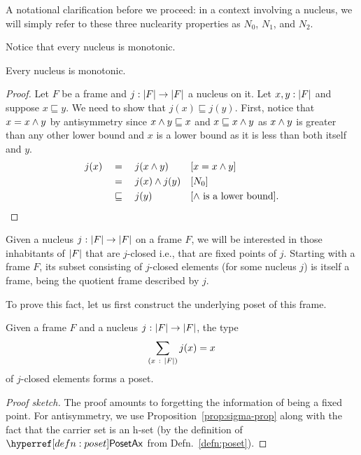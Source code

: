 A notational clarification before we proceed: in a context involving a nucleus, we will
simply refer to these three nuclearity properties as $N_0$, $N_1$, and $N_2$.

Notice that every nucleus is monotonic.
\begin{prop}\label{prop:nucleus-mono}
  Every nucleus is monotonic.
\end{prop}
\begin{proof}
  Let $F$ be a frame and $j : \left| F \right| \rightarrow \left| F \right|$ a nucleus on it. Let
  $x, y:\left| F \right|$ and suppose $x \sqsubseteq y$. We need to show that $j(x) \sqsubseteq j(y)$. First,
  notice that $x = x \wedge y$ by antisymmetry since $x \wedge y \sqsubseteq x$ and $x \sqsubseteq
  x \wedge y$ as $x \wedge y$ is greater than any other lower bound and $x$ is a lower
  bound as it is less than both itself and $y$.
  \begin{align*}
    j(x) &\quad=\quad j(x \wedge y)                 && [x = x \wedge y]                      \\
         &\quad=\quad j(x) \wedge j(y)              && [N_0]                                  \\
         &\quad\sqsubseteq\quad {j(y)}                         && [\text{$\wedge$ is a lower bound}]  .
  \end{align*}
\end{proof}

Given a nucleus $j\hspace{0.1mm}:\hspace{0.1mm}\left| F \right| \rightarrow \left| F \right|$ on a frame $F$, we will be interested in
those inhabitants of $\left| F \right|$ that are $j$-closed i.e., that are fixed points of $j$.
Starting with a frame $F$, its subset consisting of $j$-closed elements (for some nucleus
$j$) is itself a frame, being the quotient frame described by $j$.

To prove this fact, let us first construct the underlying poset of this frame.
\begin{prop}
  Given a frame $F$ and a nucleus $j\hspace{0.1mm}:\hspace{0.1mm}\left| F \right| \rightarrow \left| F \right|$, the type
  \[\sum_{(x~:~\left| F \right|)} j(x) = x\] of $j$-closed elements forms a poset.
\end{prop}
\begin{proof}[Proof sketch]
  The proof amounts to forgetting the information of being a fixed point. For
  antisymmetry, we use Proposition~\ref{prop:sigma-prop} along with the fact that the
  carrier set is an h-set (by the definition of $\posetaxnm{}$ from
  Defn.~\ref{defn:poset}).
\end{proof}

